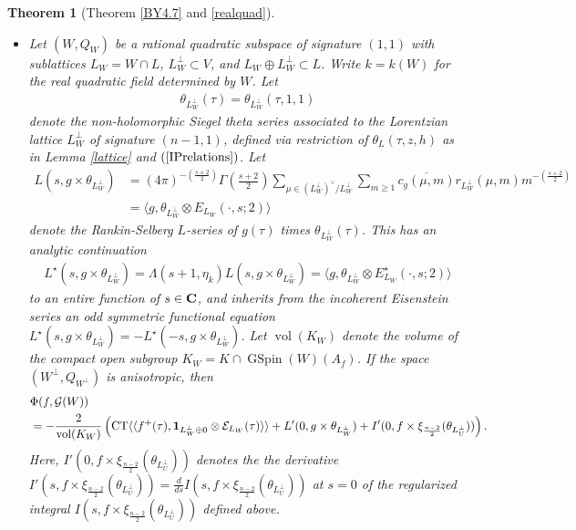 \documentclass{amsart}
\newtheorem{theorem}{Theorem}[section]
\theoremstyle{definition}
\theoremstyle{definition}
\theoremstyle{definition}
\begin{document}
\begin{theorem}[Theorem \ref{BY4.7} and \ref{realquad}]
\begin{itemize}
\item[(ii)] Let $(W, Q_W)$ be a rational quadratic subspace of signature $(1,1)$ with sublattices $L_W = W \cap L$,
$L_W^{\perp} \subset V$, and $L_W \oplus L_W^{\perp} \subset L$. 
Write $k = k(W)$ for the real quadratic field determined by $W$.
Let \begin{align*} \theta_{L_W^{\perp}}(\tau) = \theta_{L_W^{\perp}}(\tau, 1, 1) \end{align*} 
denote the non-holomorphic Siegel theta series associated 
to the Lorentzian lattice $L_W^{\perp}$ of signature $(n-1, 1)$, 
defined via restriction of $\theta_L(\tau, z, h)$ as in Lemma \ref{lattice} and $(\ref{IPrelations})$. Let 
\begin{align*} L(s, g \times \theta_{L_W^{\perp}}) 
&= (4 \pi)^{- \left( \frac{s+2}{2} \right)} \Gamma \left(\frac{s+2}{2} \right)
\sum\limits_{ \mu \in (L_W^{\perp})^{\vee}/L_W^{\perp}  } \sum\limits_{m \geq 1} \overline{c_g(\mu, m)} r_{L_W^{\perp}}(\mu, m) m^{-\left( \frac{s+2}{2} \right)} \\
&= \langle g, \theta_{L_W^{\perp}} \otimes E_{L_W}(\cdot, s; 2) \rangle \end{align*}
denote the Rankin-Selberg $L$-series of $g(\tau)$ times $\theta_{L_W^{\perp}}(\tau)$. This has an analytic continuation
\begin{align*}  L^{\star}(s, g \times \theta_{L_W^{\perp}}) = \Lambda(s+1, \eta_k) L(s, g \times \theta_{L_W^{\perp}})
= \langle g, \theta_{L_W^{\perp}} \otimes E^{\star}_{L_W}(\cdot, s; 2) \rangle \end{align*}
to an entire function of $s \in {\bf{C}}$, and inherits from the incoherent Eisenstein series an odd symmetric functional equation 
$L^{\star}(s, g \times \theta_{L_W^{\perp}}) = - L^{\star}(-s, g \times \theta_{L_W^{\perp}})$.
Let $\operatorname{vol}(K_W)$ denote the volume of the compact open subgroup $K_W = K \cap \operatorname{GSpin}(W)({{A}}_f)$. 
If the space $(W^{\perp}, Q_{W^{\perp}})$ is anisotropic, then 
\begin{align*} &\Phi(f, \mathcal{G}(W)) \\ &= - \frac{2}{ \operatorname{vol}(K_W)} \left(
\operatorname{CT} \langle \langle f^+(\tau), {\bf{1}}_{L_W^{\perp} \oplus 0} \otimes \mathcal{E}_{L_W}(\tau) \rangle \rangle
+ L'(0, g \times \theta_{L_W^{\perp}})  + I'(0, f \times \xi_{\frac{n-2}{2}}(\theta_{L_U^{\perp}}) )  \right). \end{align*} 
Here, $ I'(0, f \times \xi_{\frac{n-2}{2}}(\theta_{L_U^{\perp}}) )$ denotes the 
the derivative $I'(s, f \times \xi_{\frac{n-2}{2}}(\theta_{L_U^{\perp}}) ) = \frac{d}{ds} I(s, f \times \xi_{\frac{n-2}{2}}(\theta_{L_U^{\perp}}) )$ at $s=0$ of the 
regularized integral $I(s, f \times \xi_{\frac{n-2}{2}}(\theta_{L_U^{\perp}}) )$ defined above. 

\end{itemize} \end{theorem}
\end{document}
